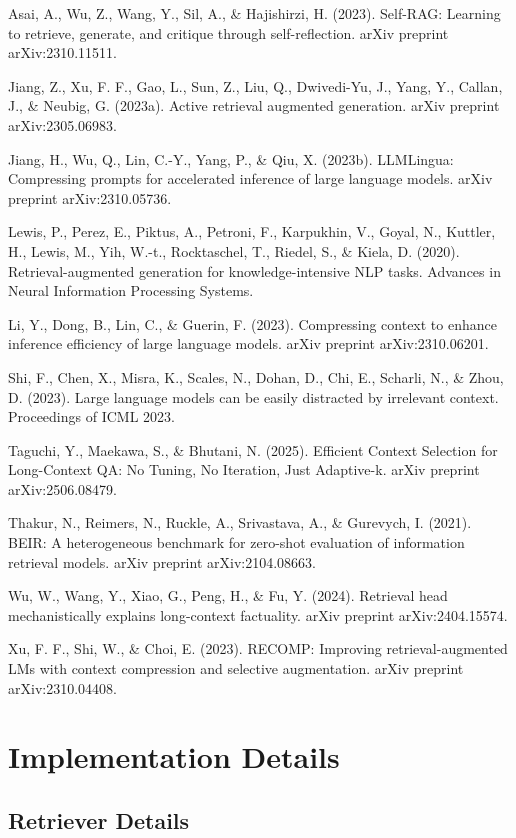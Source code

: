 \documentclass[11pt]{article}
\begin{document}
Asai, A., Wu, Z., Wang, Y., Sil, A., \& Hajishirzi, H. (2023). Self-RAG: Learning to retrieve, generate, and critique through self-reflection. arXiv preprint arXiv:2310.11511.

Jiang, Z., Xu, F. F., Gao, L., Sun, Z., Liu, Q., Dwivedi-Yu, J., Yang, Y., Callan, J., \& Neubig, G. (2023a). Active retrieval augmented generation. arXiv preprint arXiv:2305.06983.

Jiang, H., Wu, Q., Lin, C.-Y., Yang, P., \& Qiu, X. (2023b). LLMLingua: Compressing prompts for accelerated inference of large language models. arXiv preprint arXiv:2310.05736.

Lewis, P., Perez, E., Piktus, A., Petroni, F., Karpukhin, V., Goyal, N., Kuttler, H., Lewis, M., Yih, W.-t., Rocktaschel, T., Riedel, S., \& Kiela, D. (2020). Retrieval-augmented generation for knowledge-intensive NLP tasks. Advances in Neural Information Processing Systems.

Li, Y., Dong, B., Lin, C., \& Guerin, F. (2023). Compressing context to enhance inference efficiency of large language models. arXiv preprint arXiv:2310.06201.

Shi, F., Chen, X., Misra, K., Scales, N., Dohan, D., Chi, E., Scharli, N., \& Zhou, D. (2023). Large language models can be easily distracted by irrelevant context. Proceedings of ICML 2023.

Taguchi, Y., Maekawa, S., \& Bhutani, N. (2025). Efficient Context Selection for Long-Context QA: No Tuning, No Iteration, Just Adaptive-k. arXiv preprint arXiv:2506.08479.

Thakur, N., Reimers, N., Ruckle, A., Srivastava, A., \& Gurevych, I. (2021). BEIR: A heterogeneous benchmark for zero-shot evaluation of information retrieval models. arXiv preprint arXiv:2104.08663.

Wu, W., Wang, Y., Xiao, G., Peng, H., \& Fu, Y. (2024). Retrieval head mechanistically explains long-context factuality. arXiv preprint arXiv:2404.15574.

Xu, F. F., Shi, W., \& Choi, E. (2023). RECOMP: Improving retrieval-augmented LMs with context compression and selective augmentation. arXiv preprint arXiv:2310.04408.

\appendix
\onecolumn

\section{Implementation Details}

\subsection{Retriever Details}
\label{app:retriever-details}
\end{document}
